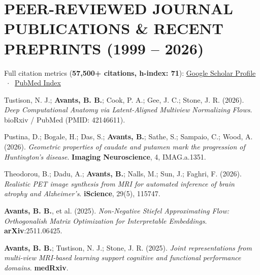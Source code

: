 \documentclass[10pt,letterpaper]{article}
\begin{document}
\section{PEER-REVIEWED JOURNAL PUBLICATIONS \& RECENT PREPRINTS (1999 -- 2026)}
{\footnotesize\color{textmuted}
Full citation metrics (\textbf{57,500+ citations, h-index: 71}): \href{https://scholar.google.com/citations?hl=en&user=t4kkowgAAAAJ&view_op=list_works&sortby=pubdate}{Google Scholar Profile} $\;\cdot\;$ \href{https://pubmed.ncbi.nlm.nih.gov/?term=Avants+B}{PubMed Index}\par\vspace{3pt}
}

\begin{enumerate}
{\footnotesize
  \item Tustison, N. J.; \textbf{Avants, B. B.}; Cook, P. A.; Gee, J. C.; Stone, J. R. (2026). \textit{Deep Computational Anatomy via Latent-Aligned Multiview Normalizing Flows}. bioRxiv / PubMed (PMID: 42146611).
  \item Pustina, D.; Bogale, H.; Das, S.; \textbf{Avants, B.}; Sathe, S.; Sampaio, C.; Wood, A. (2026). \textit{Geometric properties of caudate and putamen mark the progression of Huntington's disease}. \textbf{Imaging Neuroscience}, 4, IMAG.a.1351.
  \item Theodorou, B.; Dadu, A.; \textbf{Avants, B.}; Nalls, M.; Sun, J.; Faghri, F. (2026). \textit{Realistic PET image synthesis from MRI for automated inference of brain atrophy and Alzheimer's}. \textbf{iScience}, 29(5), 115747.

  \item \textbf{Avants, B. B.}, et al. (2025). \textit{Non-Negative Stiefel Approximating Flow: Orthogonalish Matrix Optimization for Interpretable Embeddings}. \textbf{arXiv}:2511.06425.
  \item \textbf{Avants, B. B.}; Tustison, N. J.; Stone, J. R. (2025). \textit{Joint representations from multi-view MRI-based learning support cognitive and functional performance domains}. \textbf{medRxiv}.

}
\end{enumerate}
\end{document}
